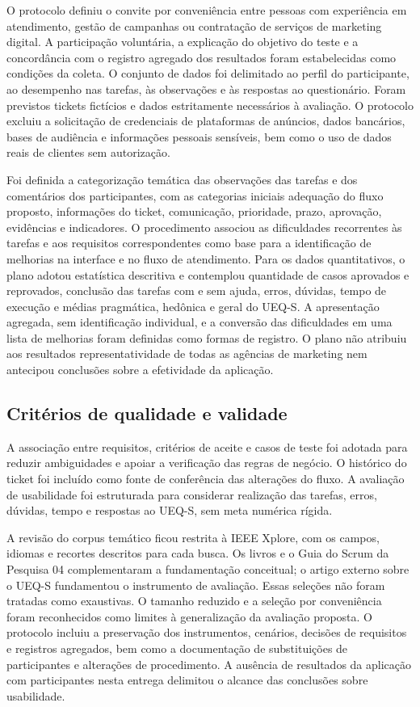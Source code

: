O protocolo definiu o convite por conveniência entre pessoas com experiência em atendimento, gestão de campanhas ou contratação de serviços de marketing digital. A participação voluntária, a explicação do objetivo do teste e a concordância com o registro agregado dos resultados foram estabelecidas como condições da coleta. O conjunto de dados foi delimitado ao perfil do participante, ao desempenho nas tarefas, às observações e às respostas ao questionário. Foram previstos tickets fictícios e dados estritamente necessários à avaliação. O protocolo excluiu a solicitação de credenciais de plataformas de anúncios, dados bancários, bases de audiência e informações pessoais sensíveis, bem como o uso de dados reais de clientes sem autorização.

Foi definida a categorização temática das observações das tarefas e dos comentários dos participantes, com as categorias iniciais adequação do fluxo proposto, informações do ticket, comunicação, prioridade, prazo, aprovação, evidências e indicadores. O procedimento associou as dificuldades recorrentes às tarefas e aos requisitos correspondentes como base para a identificação de melhorias na interface e no fluxo de atendimento. Para os dados quantitativos, o plano adotou estatística descritiva e contemplou quantidade de casos aprovados e reprovados, conclusão das tarefas com e sem ajuda, erros, dúvidas, tempo de execução e médias pragmática, hedônica e geral do UEQ-S. A apresentação agregada, sem identificação individual, e a conversão das dificuldades em uma lista de melhorias foram definidas como formas de registro. O plano não atribuiu aos resultados representatividade de todas as agências de marketing nem antecipou conclusões sobre a efetividade da aplicação.

\subsection{\esp Critérios de qualidade e validade}

A associação entre requisitos, critérios de aceite e casos de teste foi adotada para reduzir ambiguidades e apoiar a verificação das regras de negócio. O histórico do ticket foi incluído como fonte de conferência das alterações do fluxo. A avaliação de usabilidade foi estruturada para considerar realização das tarefas, erros, dúvidas, tempo e respostas ao UEQ-S, sem meta numérica rígida.

A revisão do corpus temático ficou restrita à IEEE Xplore, com os campos, idiomas e recortes descritos para cada busca. Os livros e o Guia do Scrum da Pesquisa 04 complementaram a fundamentação conceitual; o artigo externo sobre o UEQ-S fundamentou o instrumento de avaliação. Essas seleções não foram tratadas como exaustivas. O tamanho reduzido e a seleção por conveniência foram reconhecidos como limites à generalização da avaliação proposta. O protocolo incluiu a preservação dos instrumentos, cenários, decisões de requisitos e registros agregados, bem como a documentação de substituições de participantes e alterações de procedimento. A ausência de resultados da aplicação com participantes nesta entrega delimitou o alcance das conclusões sobre usabilidade.
